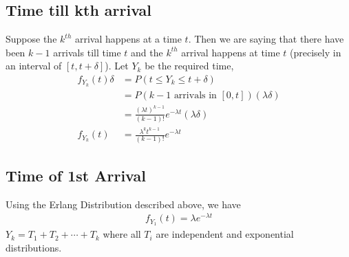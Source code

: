 \documentclass[11pt, a4paper]{article}
\begin{document}
    \subsection{Time till kth arrival}
    Suppose the $k^{th}$ arrival happens at a time $t$. Then we are saying that there have been $k-1$ arrivals till time $t$ and the $k^{th}$ arrival happens at time $t$ (precisely in an interval of $[t, t+\delta]$). Let $Y_{k}$ be the required time,
    \begin{align*}
        f_{Y_{k}}(t)\delta &= P(t \leq Y_{k} \leq t+\delta)\\
                    &= P(\text{$k-1$ arrivals  in $[0,t]$}) (\lambda \delta)\\
                    &= \frac{(\lambda t)^{k-1}}{(k-1)!}e^{-\lambda t}(\lambda \delta)\\
        f_{Y_{k}}(t) &= \frac{\lambda^{k} t^{k-1}}{(k-1)!}e^{-\lambda t} \tag*{Erland Distribution}
    \end{align*}

    \subsection{Time of 1st Arrival}
    Using the Erlang Distribution described above, we have
    \begin{align*}
        f_{Y_{1}}(t) = \lambda e^{-\lambda t}
    \end{align*}
    $Y_{k} = T_{1} + T_{2} + \cdots + T_{k}$ where all $T_{i}$ are independent and exponential distributions.
\end{document}
